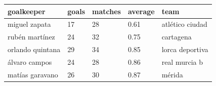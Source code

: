 \documentclass{article}
\begin{document}
\begin{tabular}{lllll}
\toprule
goalkeeper & goals & matches & average & team \\
\midrule
miguel zapata & 17 & 28 & 0.61 & atlético ciudad \\
rubén martínez & 24 & 32 & 0.75 & cartagena \\
orlando quintana & 29 & 34 & 0.85 & lorca deportiva \\
álvaro campos & 24 & 28 & 0.86 & real murcia b \\
matías garavano & 26 & 30 & 0.87 & mérida \\
\bottomrule
\end{tabular}
\end{document}
